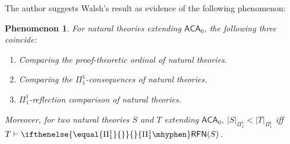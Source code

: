 \documentclass{mhkr}
\newcommand{\added}[1]{#1}
\newtheorem{phenomenon}[phenomenon]{Phenomenon}
\newcommand{\RFN}[1][]{\ifthenelse{\equal{#1}{}}{}{#1\mhyphen}\mathsf{RFN}}
\newcommand{\ACA}{\mathsf{ACA}}
\begin{document}
\added{
The author suggests Walsh's result as evidence of the following phenomenon:
\begin{phenomenon} \label{Phenomenon: Pi 1 1 comparison for natural theories}
    For natural theories extending $\ACA_0$, the following three coincide:
    \begin{enumerate}
        \item Comparing the proof-theoretic ordinal of natural theories.
        \item Comparing the $\Pi^1_1$-consequences of natural theories.
        \item $\Pi^1_1$-reflection comparison of natural theories.
    \end{enumerate}
    Moreover, for two natural theories $S$ and $T$ extending $\ACA_0$, $|S|_{\Pi^1_1} < |T|_{\Pi^1_1}$ iff $T \vdash \RFN[\Pi^1_1](S)$.
\end{phenomenon}

}
\end{document}
